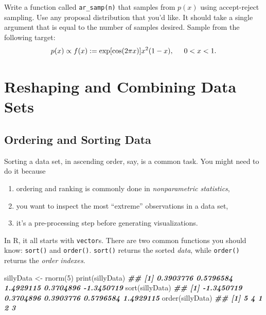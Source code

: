 \documentclass[
  12pt,
  krantz2]{krantz}
\makeatletter
\newenvironment{Shaded}{\begin{snugshade}}{\end{snugshade}}
\newcommand{\DecValTok}[1]{\textcolor[rgb]{0.06,0.06,0.06}{#1}}
\newcommand{\DocumentationTok}[1]{\textcolor[rgb]{0.37,0.37,0.37}{\textbf{\textit{#1}}}}
\newcommand{\FunctionTok}[1]{\textcolor[rgb]{0,0,0}{#1}}
\newcommand{\NormalTok}[1]{#1}
\newcommand{\OtherTok}[1]{\textcolor[rgb]{0.37,0.37,0.37}{#1}}
\providecommand{\tightlist}{%
  \setlength{\itemsep}{0pt}\setlength{\parskip}{0pt}}
\newenvironment{kframe}{%
\medskip{}
\setlength{\fboxsep}{.8em}
 \def\at@end@of@kframe{}%
 \ifinner\ifhmode%
  \def\at@end@of@kframe{\end{minipage}}%
  \begin{minipage}{\columnwidth}%
 \fi\fi%
 \def\FrameCommand##1{\hskip\@totalleftmargin \hskip-\fboxsep
 \colorbox{shadecolor}{##1}\hskip-\fboxsep
     \hskip-\linewidth \hskip-\@totalleftmargin \hskip\columnwidth}%
 \MakeFramed {\advance\hsize-\width
   \@totalleftmargin\z@ \linewidth\hsize
   \@setminipage}}%
 {\par\unskip\endMakeFramed%
 \at@end@of@kframe}
\renewenvironment{Shaded}{\begin{kframe}}{\end{kframe}}
\makeatother
\begin{document}
Write a function called \texttt{ar\_samp(n)} that samples from \(p(x)\) using accept-reject sampling. Use any proposal distribution that you'd like. It should take a single argument that is equal to the number of samples desired. Sample from the following target:
\[
  p(x) \propto f(x) := \exp[\cos(2\pi x)] x^2(1-x), \hspace{5mm} 0 < x < 1.
  \]

\hypertarget{reshaping-and-combining-data-sets}{%
\chapter{Reshaping and Combining Data Sets}\label{reshaping-and-combining-data-sets}}

\hypertarget{ordering-and-sorting-data}{%
\section{Ordering and Sorting Data}\label{ordering-and-sorting-data}}

Sorting a data set, in ascending order, say, is a common task. You might need to do it because

\begin{enumerate}
\def\labelenumi{\arabic{enumi}.}
\tightlist
\item
  ordering and ranking is commonly done in \emph{nonparametric statistics},
\item
  you want to inspect the most ``extreme'' observations in a data set,
\item
  it's a pre-processing step before generating visualizations.
\end{enumerate}

In R, it all starts with \texttt{vector}s. There are two common functions you should know: \texttt{sort()} and \texttt{order()}. \texttt{sort()} returns the sorted \emph{data}, while \texttt{order()} returns the \emph{order indexes}.

\begin{Shaded}
\begin{Highlighting}[]
\NormalTok{sillyData }\OtherTok{\textless{}{-}} \FunctionTok{rnorm}\NormalTok{(}\DecValTok{5}\NormalTok{)}
\FunctionTok{print}\NormalTok{(sillyData)}
\DocumentationTok{\#\# [1]  0.3903776  0.5796584  1.4929115  0.3704896 {-}1.3450719}
\FunctionTok{sort}\NormalTok{(sillyData)}
\DocumentationTok{\#\# [1] {-}1.3450719  0.3704896  0.3903776  0.5796584  1.4929115}
\FunctionTok{order}\NormalTok{(sillyData)}
\DocumentationTok{\#\# [1] 5 4 1 2 3}
\end{Highlighting}
\end{Shaded}
\end{document}
